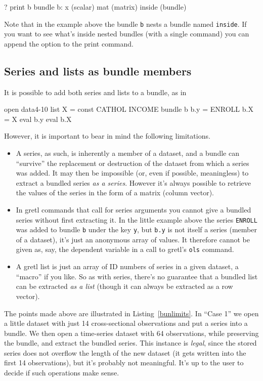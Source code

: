 \begin{code}
? print b
bundle b:
 x (scalar)
 mat (matrix)
 inside (bundle)
\end{code}

Note that in the example above the bundle \texttt{b} nests a bundle
named \texttt{inside}. If you want to see what's inside nested bundles
(with a single command) you can append the  option to the
print command.

\subsection{Series and lists as bundle members}

It is possible to add both series and lists to a bundle, as in
\begin{code}
open data4-10
list X = const CATHOL INCOME
bundle b
b.y = ENROLL
b.X = X
eval b.y
eval b.X
\end{code}

However, it is important to bear in mind the following limitations.
\begin{itemize}
\item A series, as such, is inherently a member of a dataset, and a
  bundle can ``survive'' the replacement or destruction of the dataset
  from which a series was added. It may then be impossible (or, even
  if possible, meaningless) to extract a bundled series \textit{as a
    series}. However it's always possible to retrieve the values of
  the series in the form of a matrix (column vector).
\item In gretl commands that call for series arguments you cannot give
  a bundled series without first extracting it. In the little example
  above the series \texttt{ENROLL} was added to bundle \texttt{b}
  under the key \texttt{y}, but \texttt{b.y} is not itself a series
  (member of a dataset), it's just an anonymous array of values. It
  therefore cannot be given as, say, the dependent variable in a call
  to gretl's \texttt{ols} command.
\item A gretl list is just an array of ID numbers of series in a given
  dataset, a ``macro'' if you like. So as with series, there's no
  guarantee that a bundled list can be extracted \textit{as a list}
  (though it can always be extracted as a row vector).
\end{itemize}

The points made above are illustrated in Listing~\ref{bunlimits}.  In
``Case 1'' we open a little dataset with just 14 cross-sectional
observations and put a series into a bundle. We then open a
time-series dataset with 64 observations, while preserving the bundle,
and extract the bundled series. This instance is \textit{legal}, since
the stored series does not overflow the length of the new dataset (it
gets written into the first 14 observations), but it's probably not
meaningful. It's up to the user to decide if such operations make
sense.

